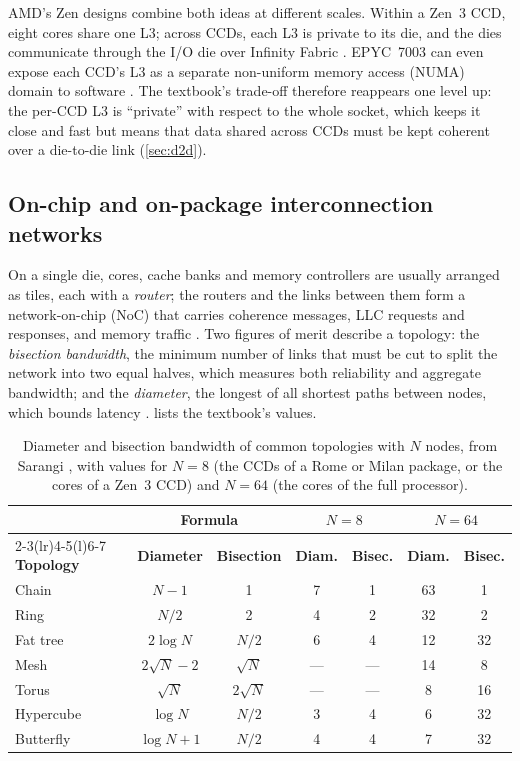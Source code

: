 AMD's Zen designs combine both ideas at different scales. Within a Zen~3 CCD, eight cores share one L3; across CCDs, each L3 is private to its die, and the dies communicate through the I/O die over Infinity Fabric \cite{amd2022epyc7003}. EPYC~7003 can even expose each CCD's L3 as a separate non-uniform memory access (NUMA) domain to software \cite{amd2022epyc7003}. The textbook's trade-off therefore reappears one level up: the per-CCD L3 is ``private'' with respect to the whole socket, which keeps it close and fast but means that data shared across CCDs must be kept coherent over a die-to-die link (\cref{sec:d2d}).

\subsection{On-chip and on-package interconnection networks}
On a single die, cores, cache banks and memory controllers are usually arranged as tiles, each with a \emph{router}; the routers and the links between them form a network-on-chip (NoC) that carries coherence messages, LLC requests and responses, and memory traffic \cite[sec.~12.6.1]{sarangi2025basic}. Two figures of merit describe a topology: the \emph{bisection bandwidth}, the minimum number of links that must be cut to split the network into two equal halves, which measures both reliability and aggregate bandwidth; and the \emph{diameter}, the longest of all shortest paths between nodes, which bounds latency \cite[sec.~12.6.2]{sarangi2025basic}.  lists the textbook's values.

\begin{table}[htbp]
  \centering
  \caption[Diameter and bisection bandwidth of common topologies]{Diameter and bisection bandwidth of common topologies with $N$ nodes, from Sarangi \cite[sec.~12.6.3]{sarangi2025basic}, with values for $N = 8$ (the CCDs of a Rome or Milan package, or the cores of a Zen~3 CCD) and $N = 64$ (the cores of the full processor).}
  \label{tab:topologies}
  \small
  \begin{tabular}{@{}lcccccc@{}}
    \toprule
    & \multicolumn{2}{c}{\textbf{Formula}} & \multicolumn{2}{c}{$N = 8$} & \multicolumn{2}{c}{$N = 64$} \\
    \cmidrule(lr){2-3}\cmidrule(lr){4-5}\cmidrule(l){6-7}
    \textbf{Topology} & \textbf{Diameter} & \textbf{Bisection} & \textbf{Diam.} & \textbf{Bisec.} & \textbf{Diam.} & \textbf{Bisec.} \\
    \midrule
    Chain & $N-1$ & 1 & 7 & 1 & 63 & 1 \\
    Ring & $N/2$ & 2 & 4 & 2 & 32 & 2 \\
    Fat tree & $2\log N$ & $N/2$ & 6 & 4 & 12 & 32 \\
    Mesh & $2\sqrt{N}-2$ & $\sqrt{N}$ & --- & --- & 14 & 8 \\
    Torus & $\sqrt{N}$ & $2\sqrt{N}$ & --- & --- & 8 & 16 \\
    Hypercube & $\log N$ & $N/2$ & 3 & 4 & 6 & 32 \\
    Butterfly & $\log N + 1$ & $N/2$ & 4 & 4 & 7 & 32 \\
    \bottomrule
  \end{tabular}
\end{table}

